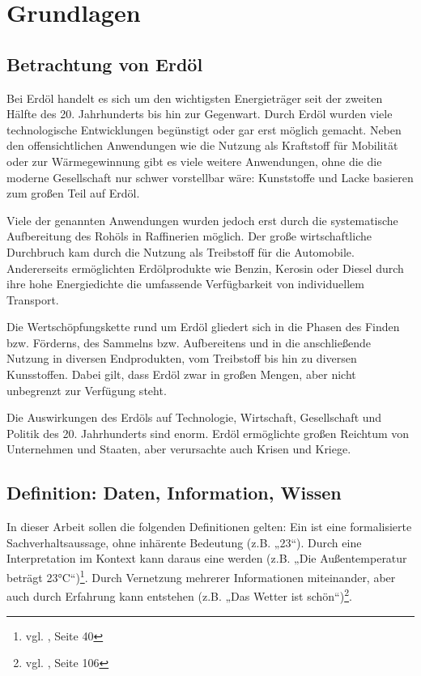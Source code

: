 \section{Grundlagen}
\label{sec:grundlagen}

\subsection{Betrachtung von Erdöl}

Bei Erdöl handelt es sich um den wichtigsten Energieträger seit der zweiten Hälfte des 20. Jahrhunderts bis hin zur Gegenwart. Durch Erdöl wurden viele technologische Entwicklungen begünstigt oder gar erst möglich gemacht. Neben den offensichtlichen Anwendungen wie die Nutzung als Kraftstoff für Mobilität oder zur Wärmegewinnung gibt es viele weitere Anwendungen, ohne die die moderne Gesellschaft nur schwer vorstellbar wäre: Kunststoffe und Lacke basieren zum großen Teil auf Erdöl.

Viele der genannten Anwendungen wurden jedoch erst durch die systematische Aufbereitung des Rohöls in Raffinerien möglich. Der große wirtschaftliche Durchbruch kam durch die Nutzung als Treibstoff für die Automobile. Andererseits ermöglichten Erdölprodukte wie Benzin, Kerosin oder Diesel durch ihre hohe Energiedichte die umfassende Verfügbarkeit von individuellem Transport.

Die Wertschöpfungskette rund um Erdöl gliedert sich in die Phasen des Finden bzw. Förderns, des Sammelns bzw. Aufbereitens und in die anschließende Nutzung in diversen Endprodukten, vom Treibstoff bis hin zu diversen Kunsstoffen.
Dabei gilt, dass Erdöl zwar in großen Mengen, aber nicht unbegrenzt zur Verfügung steht. 

Die Auswirkungen des Erdöls auf Technologie, Wirtschaft, Gesellschaft und Politik des 20. Jahrhunderts sind enorm. Erdöl ermöglichte großen Reichtum von Unternehmen und Staaten, aber verursachte auch Krisen und Kriege.

\subsection{Definition: Daten, Information, Wissen}

In dieser Arbeit sollen die folgenden Definitionen gelten: Ein  ist eine formalisierte Sachverhaltsaussage, ohne inhärente Bedeutung (z.B. „23“). Durch eine Interpretation im Kontext kann daraus eine  werden (z.B. „Die Außentemperatur beträgt 23°C“)\footnote{vgl. \cite{kfk}, Seite 40}. Durch Vernetzung mehrerer Informationen miteinander, aber auch durch Erfahrung kann  entstehen (z.B. „Das Wetter ist schön“)\footnote{vgl. \cite{pnik}, Seite 106}. 

